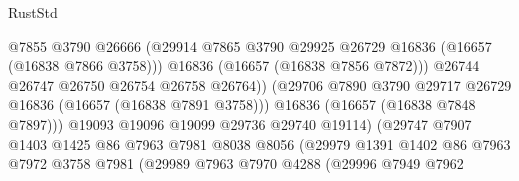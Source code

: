 \begin{lexlean}{RustStd}
\begin{coremodule}
                                          @7855
                                          @3790
                                          @26666
                                          (@29914
                                            @7865
                                            @3790
                                            @29925
                                            @26729
                                            @16836
                                            (@16657 (@16838 @7866 @3758)))
                                          @16836
                                          (@16657 (@16838 @7856 @7872)))
                                        @26744
                                        @26747
                                        @26750
                                        @26754
                                        @26758
                                        @26764))
                                    (@29706
                                      @7890
                                      @3790
                                      @29717
                                      @26729
                                      @16836
                                      (@16657 (@16838 @7891 @3758)))
                                    @16836
                                    (@16657 (@16838 @7848 @7897)))
                                  @19093
                                  @19096
                                  @19099
                                  @29736
                                  @29740
                                  @19114)
                                (@29747
                                  @7907
                                  @1403
                                  @1425
                                  @86
                                  @7963
                                  @7981
                                  @8038
                                  @8056
                                  (@29979
                                    @1391
                                    @1402
                                    @86
                                    @7963
                                    @7972
                                    @3758
                                    @7981
                                    (@29989
                                      @7963
                                      @7970
                                      @4288
                                      (@29996
                                        @7949
                                        @7962

\end{coremodule}
\end{lexlean}
